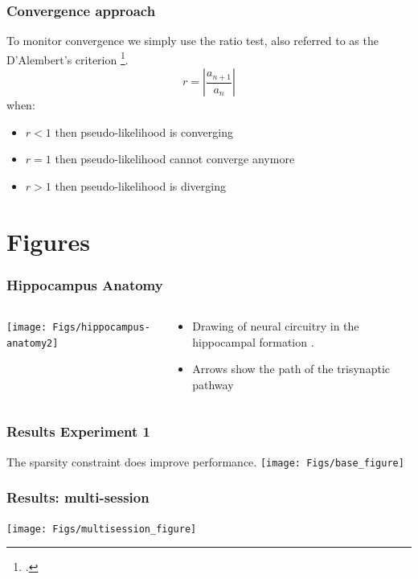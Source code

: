 \documentclass{beamer}
\begin{document}
\begin{frame}
\frametitle{Convergence approach}
To monitor convergence we simply use the ratio test, also referred to as the D'Alembert's criterion \footcite{ratio-test}.
\begin{equation}
r = |\frac{a_{n+1}}{a_{n}}| \label{eq.conv}
\end{equation}
when:
\begin{itemize}
\item[]$r < 1$ then pseudo-likelihood is converging
\item[]$r = 1$ then pseudo-likelihood cannot converge anymore
\item[]$r > 1$ then pseudo-likelihood is diverging
\end{itemize}
\end{frame}

\section*{Figures}

\begin{frame}
\frametitle{Hippocampus Anatomy}
\begin{columns}
\begin{column}{.49\linewidth}
\texttt{[image: Figs/hippocampus-anatomy2]}
\end{column}
\begin{column}{.49\linewidth}
\begin{itemize}
\item Drawing of neural circuitry in the hippocampal formation \citep{cajal-1909}. 
\item Arrows show the path of the trisynaptic pathway
\end{itemize}
\end{column}
\end{columns}
\end{frame}

\begin{frame}
\frametitle{Results Experiment 1}
\center
The sparsity constraint does improve performance.
\texttt{[image: Figs/base\_figure]}
\end{frame}

\begin{frame}
\frametitle{Results: multi-session}
\center
\texttt{[image: Figs/multisession\_figure]}
\end{frame}
\end{document}
